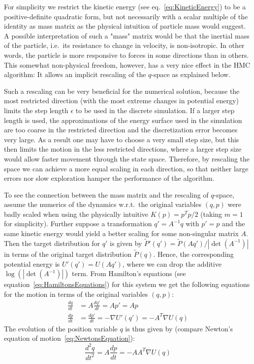For simplicity we restrict the kinetic energy (see eq.~\eqref{eq:KineticEnergy}) to be a positive-definite quadratic form, but not necessarily with a scalar multiple of the identity as mass matrix as the physical intuition of particle mass would suggest. A possible interpretation of such a "mass" matrix would be that the inertial mass of the particle, i.e.\ its resistance to change in velocity, is non-isotropic. In other words, the particle is more responsive to forces in some directions than in others. This somewhat non-physical freedom, however, has a very nice effect in the HMC algorithm: It allows an implicit rescaling of the $q$-space as explained below.

Such a rescaling can be very beneficial for the numerical solution, because the most restricted direction (with the most extreme changes in potential energy) limits the step length $\epsilon$ to be used in the discrete simulation. If a larger step length is used, the approximations of the energy surface used in the simulation are too coarse in the restricted direction and the discretization error becomes very large. As a result one may have to choose a very small step size, but this then limits the motion in the less restricted directions, where a larger step size would allow faster movement through the state space. Therefore, by rescaling the space we can achieve a more equal scaling in each direction, so that neither large errors nor slow exploration hamper the performance of the algorithm.

To see the connection between the mass matrix and the rescaling of $q$-space, assume the numerics of the dynamics w.r.t.\ the original variables $(q, p)$ were badly scaled when using the physically intuitive $K(p) = p^T p/2$ (taking $m=1$ for simplicity). Further suppose a transformation $q' = A^{-1} q$ with $p'=p$ and the same kinetic energy would yield a better scaling for some non-singular matrix $A$. Then the target distribution for $q'$ is given by $\tilde{P}'(q') = \tilde{P}(Aq')/|\det(A^{-1})|$ in terms of the original target distribution $\tilde{P}(q)$. Hence, the corresponding potential energy is $U'(q') = U(Aq')$, where we can drop the additive $\log(|\det(A^{-1})|)$ term. From Hamilton's equations (see equation~\eqref{eq:HamiltonsEquations}) for this system we get the following equations for the motion in terms of the original variables $(q, p)$:
\begin{equation}
\begin{split}
\frac{dq}{dt} &= A \frac{dq'}{dt} = Ap' = Ap \\
\frac{dp}{dt} &= \frac{dp'}{dt} = - \nabla U'(q') = - A^T \nabla U(q)
\end{split}
\end{equation}
The evolution of the position variable $q$ is thus given by (compare Newton's equation of motion~\eqref{eq:NewtonsEquation}):
\begin{equation} \label{eq:EvolutionQTransformed}
\frac{d^2q}{dt^2} = A \frac{dp}{dt} = - A A^T \nabla U(q)
\end{equation}

